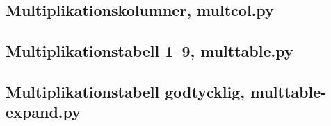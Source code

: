 \subsection{Multiplikationskolumner, multcol.py}

\begin{frame}
  
\end{frame}

\begin{frame}
  
\end{frame}

\subsection{Multiplikationstabell 1--9, multtable.py}

\begin{frame}
  
\end{frame}

\begin{frame}
  
\end{frame}

\subsection{Multiplikationstabell godtycklig, multtable-expand.py}

\begin{frame}
  
\end{frame}

\begin{frame}
  
\end{frame}


